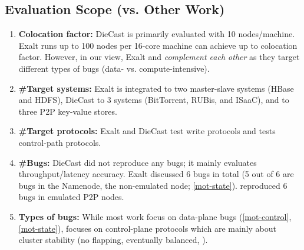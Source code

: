 


\subsection{Evaluation Scope (vs. Other Work)}
\label{eval-other}

%
\begin{enumerate}
\item {\bf Colocation factor:} DieCast is primarily evaluated with 10
nodes/machine.  Exalt runs up to 100 nodes per 16-core machine
\sck can achieve up to \maxCF colocation factor.
However, in our view, Exalt and \sck \textit{complement each other} as
they target different types of bugs (data- vs. compute-intensive).
%
\item {\bf \#Target systems:} Exalt is integrated to two master-slave
systems (HBase and HDFS), DieCast to 3 systems (BitTorrent, RUBis, and
ISaaC), and \sck to three P2P key-value stores.
%
\item {\bf \#Target protocols:} Exalt and DieCast test write protocols and
\sck tests \numProt control-path protocols.
%
\item {\bf \#Bugs:} DieCast did not reproduce any bugs; it mainly
evaluates throughput/latency accuracy.
%
Exalt discussed 6 bugs in total (5 out of 6 are bugs in the Namenode, the
non-emulated node; \sec\ref{mot-state}).
%
\sck reproduced 6 bugs in emulated P2P nodes.
%
\item {\bf Types of bugs:} While most work focus on data-plane bugs
(\sec\ref{mot-control}, \sec\ref{mot-state}), \sck focuses on
control-plane protocols which are mainly about cluster stability (no
flapping, eventually balanced, \etc).

\end{enumerate}
